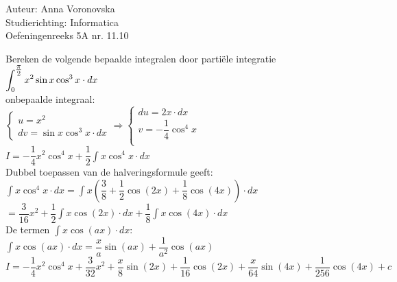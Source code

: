\documentclass[a4paper]{article}
\begin{document}
  
\noindent \large Auteur: Anna Voronovska \\
\noindent \large Studierichting: Informatica\\
\noindent \large Oefeningenreeks 5A nr. 11.10\\

\medskip

\normalsize

Bereken de volgende bepaalde integralen door partiële integratie\\

$\displaystyle\displaystyle\int_{0}^{\tfrac{\pi}{2}} x^{2} \sin x \cos^{3} x \cdot dx$ \\

onbepaalde integraal: \\

$ \left\{ \begin{array}{l} 
    u = x^{2} \\
    
    dv = \sin x \cos^{3} x \cdot dx
\end{array} \right.
\Rightarrow
\left\{ \begin{array}{l} 
    du = 2x \cdot dx\\
    
    v = -\dfrac{1}{4} \cos^{4} x\\
\end{array} \right. $ \\

$I = -\dfrac{1}{4} x^{2} \cos^{4} x + \dfrac{1}{2} \displaystyle\int x \cos^{4} x \cdot dx$ \\

Dubbel toepassen van de halveringsformule geeft:\\

$\displaystyle\int x \cos^{4} x \cdot dx = \displaystyle\int x \left( \dfrac{3}{8} + \dfrac{1}{2} \cos(2x) + \dfrac{1}{8} \cos(4x) \right) \cdot dx$ \\

$= \dfrac{3}{16} x^{2} + \dfrac{1}{2} \displaystyle\int x \cos(2x) \cdot dx + \dfrac{1}{8} \displaystyle\int x \cos(4x) \cdot dx$ \\

De termen $\displaystyle\int x \cos(ax) \cdot dx$: \\

$\displaystyle\int x \cos(ax) \cdot dx = \dfrac{x}{a} \sin(ax) + \dfrac{1}{a^{2}} \cos(ax)$ \\

$I = -\dfrac{1}{4} x^{2} \cos^{4} x + \dfrac{3}{32} x^{2} + \dfrac{x}{8} \sin(2x) + \dfrac{1}{16} \cos(2x) + \dfrac{x}{64} \sin(4x) + \dfrac{1}{256} \cos(4x) + c$ \\
\end{document}
